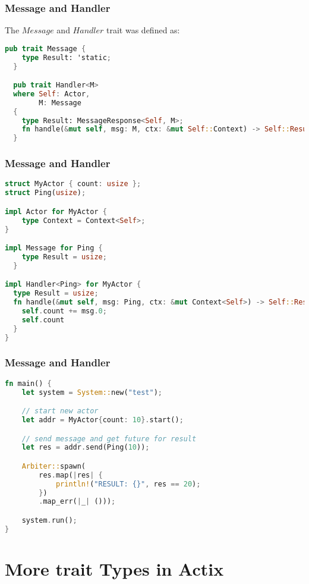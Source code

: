 \documentclass[notheorems, aspectratio=54]{beamer}
\begin{document}
\begin{frame}[fragile]
  \frametitle{Message and Handler}
  The $Message$ and $Handler$ trait was defined as:
  \begin{lstlisting}[language=Rust]
  pub trait Message {
    type Result: 'static;
  }

  pub trait Handler<M>
  where Self: Actor,
        M: Message
  {
    type Result: MessageResponse<Self, M>;
    fn handle(&mut self, msg: M, ctx: &mut Self::Context) -> Self::Result;
  }
  \end{lstlisting}
\end{frame}

\begin{frame}[fragile]

  \frametitle{Message and Handler}
  \begin{lstlisting}[language=Rust]
struct MyActor { count: usize };
struct Ping(usize);

impl Actor for MyActor {
    type Context = Context<Self>;
}

impl Message for Ping {
    type Result = usize;
  }

impl Handler<Ping> for MyActor {
  type Result = usize;
  fn handle(&mut self, msg: Ping, ctx: &mut Context<Self>) -> Self::Result {
    self.count += msg.0;
    self.count
  }
}
  \end{lstlisting}
\end{frame}


\begin{frame}[fragile]

  \frametitle{Message and Handler}
  \begin{lstlisting}[language=Rust]
fn main() {
    let system = System::new("test");

    // start new actor
    let addr = MyActor{count: 10}.start();

    // send message and get future for result
    let res = addr.send(Ping(10));

    Arbiter::spawn(
        res.map(|res| {
            println!("RESULT: {}", res == 20);
        })
        .map_err(|_| ()));

    system.run();
}
\end{lstlisting}
\end{frame}


\section{More trait Types in Actix}
\end{document}
